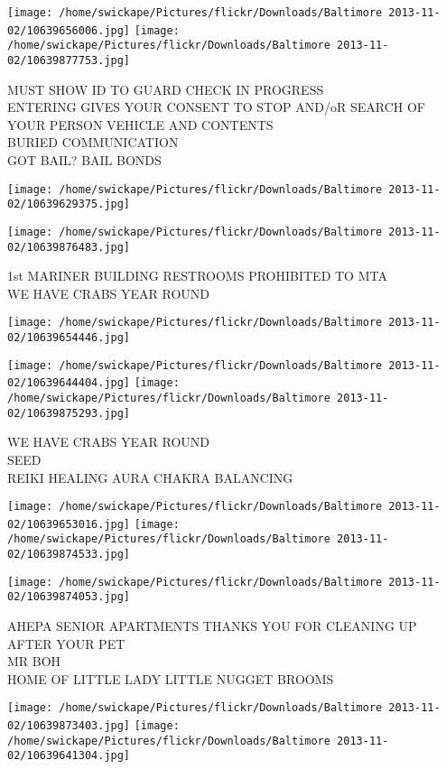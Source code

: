 \documentclass[10pt,letterpaper]{article}
\begin{document}
\texttt{[image: /home/swickape/Pictures/flickr/Downloads/Baltimore 2013-11-02/10639656006.jpg]}
\texttt{[image: /home/swickape/Pictures/flickr/Downloads/Baltimore 2013-11-02/10639877753.jpg]}

MUST SHOW ID TO GUARD CHECK IN PROGRESS\\
ENTERING GIVES YOUR CONSENT TO STOP AND/oR SEARCH OF YOUR PERSON VEHICLE AND CONTENTS\\
BURIED COMMUNICATION\\
GOT BAIL?  BAIL BONDS
\pagebreak

\texttt{[image: /home/swickape/Pictures/flickr/Downloads/Baltimore 2013-11-02/10639629375.jpg]}

\vspace{0.25in}
\texttt{[image: /home/swickape/Pictures/flickr/Downloads/Baltimore 2013-11-02/10639876483.jpg]}

1st MARINER BUILDING RESTROOMS PROHIBITED TO MTA\\
WE HAVE CRABS YEAR ROUND
\pagebreak

\texttt{[image: /home/swickape/Pictures/flickr/Downloads/Baltimore 2013-11-02/10639654446.jpg]}

\vspace{0.25in}
\texttt{[image: /home/swickape/Pictures/flickr/Downloads/Baltimore 2013-11-02/10639644404.jpg]}
\texttt{[image: /home/swickape/Pictures/flickr/Downloads/Baltimore 2013-11-02/10639875293.jpg]}

WE HAVE CRABS YEAR ROUND\\
SEED\\
REIKI HEALING AURA CHAKRA BALANCING
\pagebreak

\texttt{[image: /home/swickape/Pictures/flickr/Downloads/Baltimore 2013-11-02/10639653016.jpg]}
\texttt{[image: /home/swickape/Pictures/flickr/Downloads/Baltimore 2013-11-02/10639874533.jpg]}

\vspace{0.25in}
\texttt{[image: /home/swickape/Pictures/flickr/Downloads/Baltimore 2013-11-02/10639874053.jpg]}

AHEPA SENIOR APARTMENTS THANKS YOU FOR CLEANING UP AFTER YOUR PET\\
MR BOH\\
HOME OF LITTLE LADY LITTLE NUGGET BROOMS
\pagebreak

\texttt{[image: /home/swickape/Pictures/flickr/Downloads/Baltimore 2013-11-02/10639873403.jpg]}
\texttt{[image: /home/swickape/Pictures/flickr/Downloads/Baltimore 2013-11-02/10639641304.jpg]}
\end{document}
